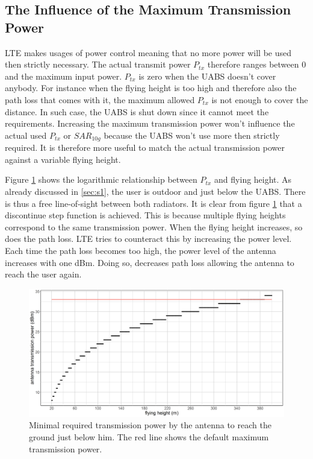 \subsection{The Influence of the Maximum Transmission Power}
\label{s1a}
\gls{LTE} makes usages of power control meaning that no more power will be used then strictly necessary. The actual 
transmit power $P_{tx}$ therefore ranges between 0 and the maximum input power. $P_{tx}$ is zero when the \gls{UABS} doesn't cover anybody.
For instance when the flying height is too high and therefore also the path loss that comes with it, the maximum allowed $P_{tx}$ is not enough to cover 
the distance. In such case, the \gls{UABS} is shut down since it cannot meet the requirements.
Increasing the maximum transmission power won't influence the actual used $P_{tx}$ or $SAR_{10g}$ because the \gls{UABS} won't use more
then strictly required. It is therefore more useful to match the actual transmission power against a variable flying height. 

Figure \ref{fig:ptxfh} shows the logarithmic relationship between $P_{tx}$ and flying height.
As already discussed in \ref{sec:s1}, the user is outdoor and just below the \gls{UABS}. There is thus a free line-of-sight between both
radiators. It is clear  from figure \ref{fig:ptxfh} that a discontinue step function is achieved. This is because multiple flying heights correspond to the same transmission power.
When the flying height increases, so does the path loss. \gls{LTE} tries to counteract this by increasing the power level. Each time 
the path loss becomes too high, the power level of the antenna increases with one dBm. Doing so, decreases path loss allowing the antenna to reach
the user again. 

\begin{figure}[t]
  \centering
  \includegraphics[width=\textwidth]{../results/s1/ptx.png}
  \caption{Minimal required transmission power by the antenna to reach the ground just below him. The red line shows the default maximum transmission power.}
  \label{fig:ptxfh}
\end{figure}

